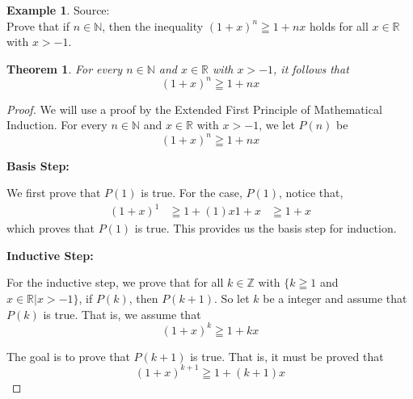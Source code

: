 \documentclass{book}
\newtheorem{theorem}{Theorem}[section]
\theoremstyle{definition}
\newtheorem{example}{Example}[definition]
\theoremstyle{remark}
\newcommand{\bb}[1]{\mathbb{#1}}
\begin{document}
\begin{example}
Source: \cite[C.10]{Hammack} \\ 

Prove that if $n \in \bb{N}$, then the inequality $(1+x)^n \geqq 1 + nx$ holds for all $x \in \bb{R}$ with $x > -1$.
\begin{tcolorbox}
    \begin{theorem}
        For every $n \in \bb{N}$ and $x \in \bb{R}$ with $x > -1$, it follows that 
        \begin{equation*}
            (1+x)^n \geqq 1 + nx              
        \end{equation*}
    \end{theorem}
\end{tcolorbox}

\begin{proof}
    We will use a proof by the Extended First Principle of Mathematical Induction. For every $n \in \bb{N}$ and $x \in \bb{R}$ with $x > -1$, we let $P(n)$ be
        \begin{equation*}
            (1+x)^n \geqq 1 + nx  
        \end{equation*}
        
    \begin{flushleft} \textbf{Basis Step:} \end{flushleft}
        We first prove that $P(1)$ is true. For the case, $P(1)$, notice that,   
            \begin{align*}
                (1+x)^1 & \geqq 1 + (1)x
                1 + x   & \geqq 1 + x
            \end{align*}
        which proves that $P(1)$ is true. This provides us the basis step for induction. \\ 
    
    \begin{flushleft} \textbf{Inductive Step:} \end{flushleft}
        For the inductive step, we prove that for all $k \in \bb{Z}$ with $\{k \geqq 1$ and $x \in \bb{R} | x > -1 \}$, if $P(k)$, then $P(k+1)$. So let $k$ be a integer and assume that $P(k)$ is true. That is, we assume that 
            \begin{equation*}
            (1+x)^k \geqq 1 + kx 
            \end{equation*}
        
        The goal is to prove that $P(k+1)$ is true. That is, it must be proved that  
            \begin{equation*}
            (1+x)^{k+1} \geqq 1 + (k+1)x 
            \end{equation*}
        

\end{proof}
\end{example}
\end{document}
